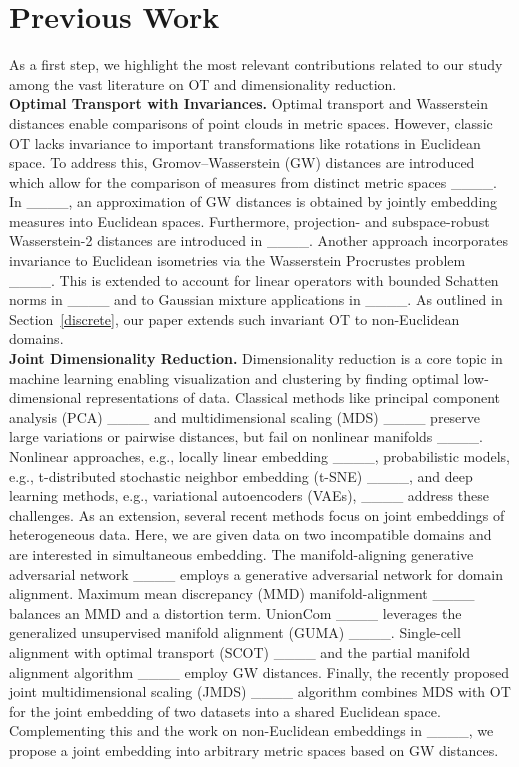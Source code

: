 \section{Previous Work}
As a first step, we highlight the most relevant contributions related to our study among the vast literature on OT and dimensionality reduction.
\\[1ex]
\textbf{Optimal Transport with Invariances.} 
Optimal transport and Wasserstein distances enable comparisons of point clouds in metric spaces. 
However, 
classic OT
lacks invariance to important transformations 
like rotations in Euclidean space. 
To address this,
Gromov--Wasserstein (GW) distances 
are introduced which allow 
for the comparison of
measures from distinct metric spaces 
____. 
In ____,
an approximation of GW distances is obtained
by jointly embedding measures 
into Euclidean spaces. 
Furthermore,
projection- and
subspace-robust Wasserstein-2 distances
are introduced in 
____. 
Another approach incorporates invariance 
to Euclidean isometries 
via the Wasserstein Procrustes problem ____.
This is extended to account 
for linear operators 
with bounded Schatten norms in ____ 
and to Gaussian mixture applications in ____. 
As outlined in Section~\ref{discrete}, our paper extends such invariant OT to non-Euclidean domains.
\\[1ex]
\textbf{Joint Dimensionality Reduction.} 
Dimensionality reduction is a core topic in machine learning enabling visualization and clustering by finding optimal low-dimensional representations of data. Classical methods like principal component analysis (PCA) ____ and multidimensional scaling (MDS) ____ preserve large variations or pairwise distances, but fail on nonlinear manifolds ____. 
Nonlinear approaches, e.g., locally linear embedding ____, 
probabilistic models, e.g., t-distributed stochastic neighbor embedding (t-SNE) ____, and deep learning methods, e.g., variational autoencoders (VAEs), ____ address these challenges. 
As an extension, several recent methods focus on joint embeddings of heterogeneous data. Here, we are given data on two incompatible domains and are interested in simultaneous embedding. The manifold-aligning generative adversarial network ____ employs a generative adversarial network for domain alignment. Maximum mean discrepancy (MMD) manifold-alignment ____ balances an MMD and a distortion term. UnionCom ____ leverages the generalized unsupervised manifold alignment (GUMA) ____.  Single-cell alignment with optimal transport (SCOT) ____ and the partial manifold alignment algorithm ____ employ GW distances. Finally, the recently proposed joint multidimensional scaling (JMDS) ____ algorithm combines MDS with OT for the joint embedding of two 
datasets into a shared Euclidean space. Complementing this and the work on non-Euclidean embeddings in ____, we propose a joint embedding into arbitrary metric spaces based on GW distances.